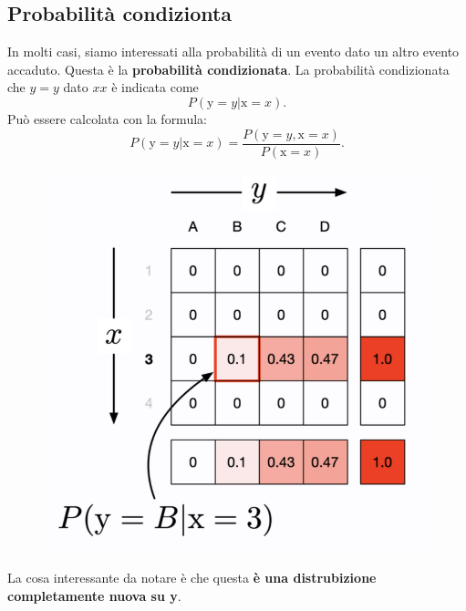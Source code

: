 \subsection{Probabilità condizionta}
In molti casi, siamo interessati alla probabilità di un evento dato un altro evento accaduto. Questa è la \textbf{probabilità condizionata}. La probabilità condizionata che $y=\textit{y}$ dato $x\textit{x}$ è indicata come
\begin{equation}
    \textit{P}(\text{y}=y|\text{x}=x).
\end{equation}
Può essere calcolata con la formula:
\begin{equation}
    P(\text{y}=y|\text{x}=x)=\frac{P(\text{y}=y,\text{x}=x)}{P(\text{x}=x)}.
\end{equation}
\begin{figure}[!h]
    \includegraphics[scale=.5]{images/prerequisites/condProb.png}
    \centering
\end{figure}



La cosa interessante da notare è che questa \textbf{è una distrubizione completamente nuova su y}.


